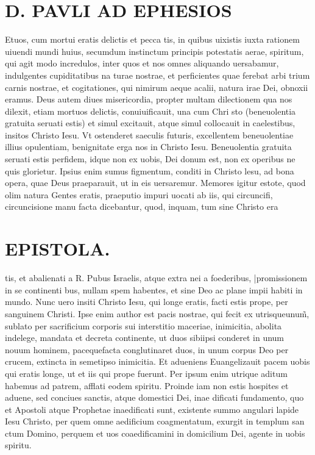 \documentclass{article}
\begin{document}
\begin{pages}
\section*{D. PAVLI AD EPHESIOS }
\marginpar{[ p.1. ]}
\marginpar{[ p.2. ]}
\marginpar{[ p.3. ]}
\marginpar{[ p.4. ]}\pstart Etuos, cum mortui eratis delictis et pecca tis, in quibus uixistis iuxta rationem uiuendi mundi huius, secumdum instinctum principis potestatis aerae, spiritum, qui agit modo incredulos, inter quos et nos omnes aliquando uersabamur, indulgentes cupiditatibus na turae nostrae, et perficientes quae ferebat arbi trium carnis nostrae, et cogitationes, qui nimirum aeque acalii, natura irae Dei, obnoxii eramus.  \pend\pstart Deus autem diues misericordia, propter multam dilectionem qua nos dilexit, etiam mortuos delictis, conuiuificauit, una cum Chri sto (beneuolentia gratuita seruati estis) et simul excitauit, atque simul collocauit in caelestibus, insitos Christo Iesu. Vt ostenderet saeculis futuris, excellentem beneuolentiae illius opulentiam, benignitate erga nos in Christo Iesu.  \pend\pstart Beneuolentia gratuita seruati estis perfidem, idque non ex uobis, Dei donum est, non ex operibus ne quis glorietur. Ipsius enim sumus figmentum, conditi in Christo lesu, ad bona opera, quae Deus praeparauit, ut in eis uersaremur.  \pend\pstart Memores igitur estote, quod olim natura Gentes eratis, praeputio impuri uocati ab iis, qui circuncifi, circuncisione manu facta dicebantur, quod, inquam, tum sine Christo era\pend
\section*{EPISTOLA. }
\marginpar{[ p.11 ]}
\marginpar{[ p.50 ]}
\marginpar{[ p.60 ]}
\marginpar{[ p.70 ]}\pstart tis, et abalienati a R. Pubus  Israelis, atque extra nei a foederibus, |promissionem in se continenti bus, nullam spem habentes, et sine Deo ac plane impii habiti in mundo.  \pend\pstart Nunc uero insiti Christo Iesu, qui longe eratis, facti estis prope, per sanguinem Christi. Ipse enim author est pacis nostrae, qui fecit ex utrisqueunum̃, sublato per sacrificium corporis sui interstitio maceriae, inimicitia, abolita indelege, mandata et decreta continente, ut duos sibiipsi conderet in unum nouum hominem, pacequefacta conglutinaret duos, in unum corpus Deo per crucem, extincta in semetipso inimicitia.  \pend\pstart Et adueniens Euangelizauit pacem uobis qui eratis longe, ut et iis qui prope fuerunt. Per ipsum enim utrique aditum habemus ad patrem, afflati eodem spiritu.  \pend\pstart Proinde iam non estis hospites et aduene, sed conciues sanctis, atque domestici Dei, inae dificati fundamento, quo et Apostoli atque Prophetae inaedificati sunt, existente summo angulari lapide Iesu Christo, per quem omne aedificium coagmentatum, exurgit in templum san ctum Domino, perquem et uos coaedificamini in domicilium Dei, agente in uobis spiritu.  \pend

\end{pages}
\end{document}
